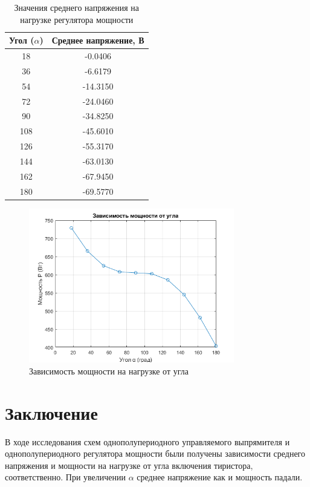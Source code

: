 \begin{table}[H]
    \centering
    \caption{Значения среднего напряжения на нагрузке регулятора мощности}
    \label{tab:средн_напр_на_нагрузке_мощ}
    \begin{tabular}{|c|c|}
        \hline
        Угол ($\alpha$) & Среднее напряжение, В \\
        \hline
        18 & -0.0406 \\
        36 & -6.6179 \\
        54 & -14.3150 \\
        72 & -24.0460 \\
        90 & -34.8250 \\
        108 & -45.6010 \\
        126 & -55.3170 \\
        144 & -63.0130 \\
        162 & -67.9450 \\
        180 & -69.5770 \\
        \hline
    \end{tabular}
\end{table}

\begin{figure}[H]
    \centering
    \includegraphics[width=0.8\textwidth]{figs/мощ_альфа.png}
    \caption{Зависимость мощности на нагрузке от угла}
    \label{fig:мощ_альфа}
\end{figure}


\section*{Заключение}

В ходе исследования схем однополупериодного управляемого
выпрямителя и однополупериодного регулятора
мощности были получены зависимости среднего напряжения и мощности
на нагрузке от угла включения тиристора, соответственно. При увеличении $\alpha$ среднее напряжение
как и мощность падали.
